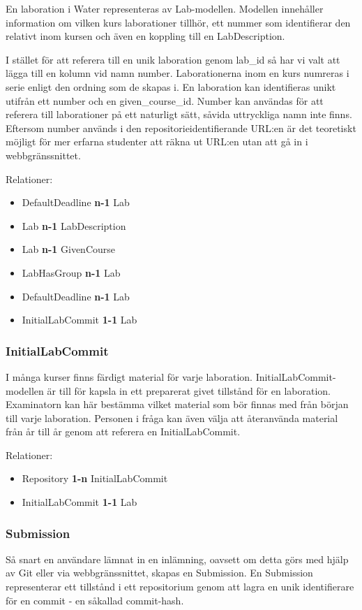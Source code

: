 En laboration i Water representeras av Lab-modellen. Modellen innehåller information om vilken kurs laborationer tillhör, ett nummer som identifierar den relativt inom kursen och även en koppling till en LabDescription.

I stället för att referera till en unik laboration genom lab\_id så har vi valt att lägga till en kolumn vid namn number. Laborationerna inom en kurs numreras i serie enligt den ordning som de skapas i. En laboration kan identifieras unikt utifrån ett number och en given\_course\_id. Number kan användas för att referera till laborationer på ett naturligt sätt, såvida uttryckliga namn inte finns. Eftersom number används i den repositorieidentifierande URL:en är det teoretiskt möjligt för mer erfarna studenter att räkna ut URL:en utan att gå in i webbgränssnittet.

Relationer: 
\begin{itemize}
  \item DefaultDeadline {\bf n-1} Lab
  \item Lab {\bf n-1} LabDescription
  \item Lab {\bf n-1} GivenCourse
  \item LabHasGroup {\bf n-1} Lab
  \item DefaultDeadline {\bf n-1} Lab
  \item InitialLabCommit {\bf 1-1} Lab
\end{itemize}

\subsubsection{InitialLabCommit}
I många kurser finns färdigt material för varje laboration. InitialLabCommit-modellen är till för kapsla in ett preparerat givet tillstånd för en laboration. Examinatorn kan här bestämma vilket material som bör finnas med från början till varje laboration. Personen i fråga kan även välja att återanvända material från år till år genom att referera en InitialLabCommit.

Relationer: 
\begin{itemize}
  \item Repository {\bf 1-n} InitialLabCommit 
  \item InitialLabCommit {\bf 1-1} Lab
\end{itemize}

\subsubsection{Submission}
Så snart en användare lämnat in en inlämning, oavsett om detta görs med hjälp av Git eller via webbgränssnittet, skapas en Submission. En Submission representerar ett tillstånd i ett repositorium genom att lagra en unik identifierare för en commit - en såkallad commit-hash.

